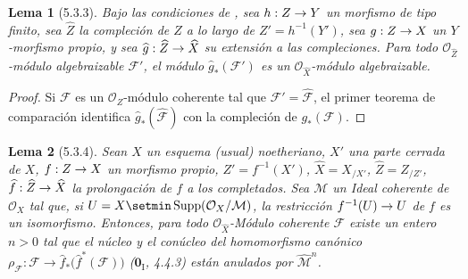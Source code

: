 \documentclass[10pt,oneside,openany]{book}
\theoremstyle{egaenv}\newtheorem*{env}{---}
\theoremstyle{egastatement}
\newtheorem*{lemma}{Lema}
\theoremstyle{egadescription}
\renewcommand{\to}{\mathchoice{\longrightarrow}{\rightarrow}{\rightarrow}{\rightarrow}}
\begin{document}
\begin{lemma}[5.3.3]
\label{III.5.3.3}
\label{III.5.3.3-fr}
Bajo las condiciones de , sea $h:Z\to Y$ un
morfismo de tipo finito, sea $\widehat Z$ la compleción de $Z$
a lo largo de $Z'=h^{-1}(Y')$, sea $g:Z\to X$ un $Y$-morfismo propio,
y sea $\widehat g:\widehat Z\to\widehat X$ su extensión a
las compleciones. Para todo $\mathcal O_{\widehat Z}$-módulo
algebraizable $\mathcal F'$, el módulo
$\widehat g_*(\mathcal F')$ es un
$\mathcal O_{\widehat X}$-módulo algebraizable.
\end{lemma}

\begin{proof}
Si $\mathcal F$ es un $\mathcal O_Z$-módulo coherente tal que
$\mathcal F'=\widehat{\mathcal F}$, el primer teorema de comparación
 identifica
$\widehat g_*(\widehat{\mathcal F})$ con la compleción de
$g_*(\mathcal F)$.
\end{proof}

\begin{lemma}[5.3.4]
\label{III.5.3.4-fr}
Sean $X$ un esquema (usual) noetheriano, $X'$ una parte cerrada de $X$,
$f:Z\to X$ un morfismo propio, $Z'=f^{-1}(X')$,
$\widehat X=X_{/X'}$, $\widehat Z=Z_{/Z'}$,
$\widehat f:\widehat Z\to\widehat X$ la prolongación de $f$ a los completados. Sea
$\mathcal M$ un Ideal coherente de $\mathcal O_X$ tal que, si
$U=X\setmin\operatorname{Supp}(\mathcal O_X/\mathcal M)$, la restricción
$f^{-1}(U)\to U$ de $f$ es un isomorfismo. Entonces, para todo
$\mathcal O_{\widehat X}$-Módulo coherente $\mathcal F$ existe un entero $n>0$
tal que el núcleo y el conúcleo del homomorfismo canónico
$\rho_{\mathcal F}:\mathcal F\longrightarrow
\widehat f_*\bigl(\widehat f^{*}(\mathcal F)\bigr)$
\textup{($\mathbf{0}_{\mathrm I}$, 4.4.3)} están anulados por $\widehat{\mathcal M}^{n}$.
\end{lemma}
\end{document}
